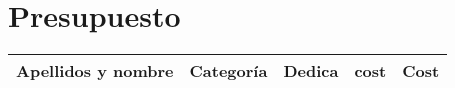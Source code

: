 \chapter{Presupuesto}

\begin{tabular}{ >{\centering\arraybackslash}m{} >{\centering\arraybackslash}m{} >{\centering\arraybackslash}m{} >{\arraybackslash}m{}  >{\arraybackslash}m{}}
 \hline
Apellidos y nombre & Categoría & Dedica & cost & Cost \\
 \hline
\end{tabular}
